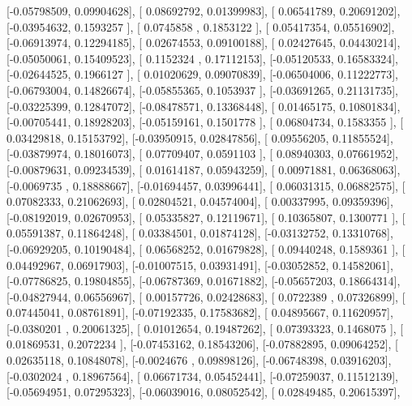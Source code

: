 \documentclass{article}
\begin{document}
       [-0.05798509,  0.09904628],
       [ 0.08692792,  0.01399983],
       [ 0.06541789,  0.20691202],
       [-0.03954632,  0.1593257 ],
       [ 0.0745858 ,  0.1853122 ],
       [ 0.05417354,  0.05516902],
       [-0.06913974,  0.12294185],
       [ 0.02674553,  0.09100188],
       [ 0.02427645,  0.04430214],
       [-0.05050061,  0.15409523],
       [ 0.1152324 ,  0.17112153],
       [-0.05120533,  0.16583324],
       [-0.02644525,  0.1966127 ],
       [ 0.01020629,  0.09070839],
       [-0.06504006,  0.11222773],
       [-0.06793004,  0.14826674],
       [-0.05855365,  0.1053937 ],
       [-0.03691265,  0.21131735],
       [-0.03225399,  0.12847072],
       [-0.08478571,  0.13368448],
       [ 0.01465175,  0.10801834],
       [-0.00705441,  0.18928203],
       [-0.05159161,  0.1501778 ],
       [ 0.06804734,  0.1583355 ],
       [ 0.03429818,  0.15153792],
       [-0.03950915,  0.02847856],
       [ 0.09556205,  0.11855524],
       [-0.03879974,  0.18016073],
       [ 0.07709407,  0.0591103 ],
       [ 0.08940303,  0.07661952],
       [-0.00879631,  0.09234539],
       [ 0.01614187,  0.05943259],
       [ 0.00971881,  0.06368063],
       [-0.0069735 ,  0.18888667],
       [-0.01694457,  0.03996441],
       [ 0.06031315,  0.06882575],
       [ 0.07082333,  0.21062693],
       [ 0.02804521,  0.04574004],
       [ 0.00337995,  0.09359396],
       [-0.08192019,  0.02670953],
       [ 0.05335827,  0.12119671],
       [ 0.10365807,  0.1300771 ],
       [ 0.05591387,  0.11864248],
       [ 0.03384501,  0.01874128],
       [-0.03132752,  0.13310768],
       [-0.06929205,  0.10190484],
       [ 0.06568252,  0.01679828],
       [ 0.09440248,  0.1589361 ],
       [ 0.04492967,  0.06917903],
       [-0.01007515,  0.03931491],
       [-0.03052852,  0.14582061],
       [-0.07786825,  0.19804855],
       [-0.06787369,  0.01671882],
       [-0.05657203,  0.18664314],
       [-0.04827944,  0.06556967],
       [ 0.00157726,  0.02428683],
       [ 0.0722389 ,  0.07326899],
       [ 0.07445041,  0.08761891],
       [-0.07192335,  0.17583682],
       [ 0.04895667,  0.11620957],
       [-0.0380201 ,  0.20061325],
       [ 0.01012654,  0.19487262],
       [ 0.07393323,  0.1468075 ],
       [ 0.01869531,  0.2072234 ],
       [-0.07453162,  0.18543206],
       [-0.07882895,  0.09064252],
       [ 0.02635118,  0.10848078],
       [-0.0024676 ,  0.09898126],
       [-0.06748398,  0.03916203],
       [-0.0302024 ,  0.18967564],
       [ 0.06671734,  0.05452441],
       [-0.07259037,  0.11512139],
       [-0.05694951,  0.07295323],
       [-0.06039016,  0.08052542],
       [ 0.02849485,  0.20615397],
\end{document}
